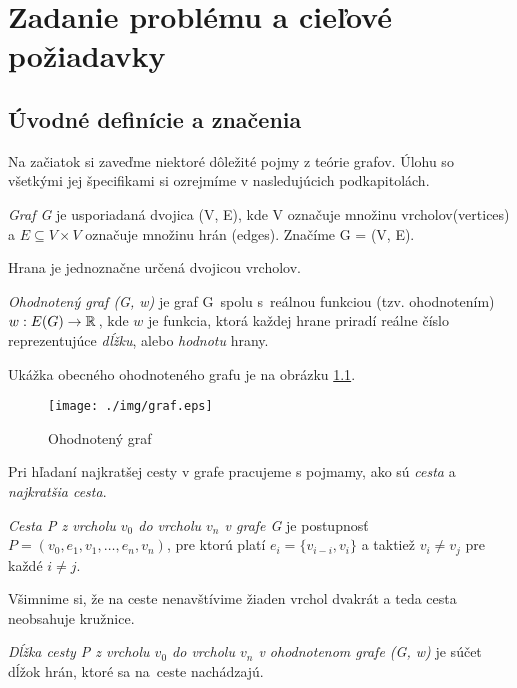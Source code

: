 \chapter{Zadanie problému a cieľové požiadavky}

\section{Úvodné definície a značenia}
Na začiatok si zaveďme niektoré dôležité pojmy z teórie grafov.
Úlohu so všetkými jej špecifikami si ozrejmíme v nasledujúcich podkapitolách.
\begin{define}
{\sl Graf G} je usporiadaná dvojica (V, E), kde V označuje množinu vrcholov(vertices) a $E \subseteq V \times V $ označuje množinu hrán (edges). Značíme G = (V, E).
\end{define}


\begin{note}
Hrana je jednoznačne určená dvojicou vrcholov.
\end{note}


\begin{define}
{\sl Ohodnotený graf (G, w)} je graf G~spolu s~reálnou funkciou (tzv. ohodnotením)
$w: E(G) \to \mathbb{R}\,$, kde $w$ je funkcia, ktorá každej hrane priradí
reálne číslo reprezentujúce \emph{dĺžku}, alebo \emph{hodnotu} hrany.
\end{define}

Ukážka obecného ohodnoteného grafu je na obrázku \ref{fig:ohodnoteny_graf}.

\begin{figure}[h]
\centering
\texttt{[image: ./img/graf.eps]}
\caption{Ohodnotený graf}
\label{fig:ohodnoteny_graf}
\end{figure}

Pri hľadaní najkratšej cesty v grafe pracujeme s pojmamy, ako 
sú \emph{cesta} a \emph{najkratšia cesta}.

\begin{define}
{\sl Cesta P z vrcholu $v_0$ do vrcholu $v_n$ v grafe G } je postupnosť $P = (v_{0},e_{1},v_{1},\dots, e_{n}, v_{n})$,
pre ktorú platí $e_{i} = \{v_{i-i},v_{i}\}$ a taktiež
$v_{i} \ne v_{j}$ pre každé $i \ne j$.
\end{define}

Všimnime si, že na ceste nenavštívime žiaden vrchol dvakrát a teda cesta neobsahuje kružnice.


\begin{define}
{\sl Dĺžka cesty P z vrcholu $v_0$ do vrcholu $v_n$ v ohodnotenom grafe (G, w) } je súčet dĺžok hrán, ktoré sa na~ceste nachádzajú.
\end{define}

